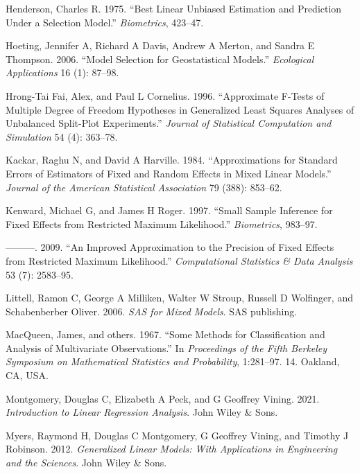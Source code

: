 \documentclass{article}
\begin{document}
\leavevmode\hypertarget{ref-henderson1975best}{}%
Henderson, Charles R. 1975. ``Best Linear Unbiased Estimation and
Prediction Under a Selection Model.'' \emph{Biometrics}, 423--47.

\leavevmode\hypertarget{ref-hoeting2006model}{}%
Hoeting, Jennifer A, Richard A Davis, Andrew A Merton, and Sandra E
Thompson. 2006. ``Model Selection for Geostatistical Models.''
\emph{Ecological Applications} 16 (1): 87--98.

\leavevmode\hypertarget{ref-hrong1996approximate}{}%
Hrong-Tai Fai, Alex, and Paul L Cornelius. 1996. ``Approximate F-Tests
of Multiple Degree of Freedom Hypotheses in Generalized Least Squares
Analyses of Unbalanced Split-Plot Experiments.'' \emph{Journal of
Statistical Computation and Simulation} 54 (4): 363--78.

\leavevmode\hypertarget{ref-kackar1984approximations}{}%
Kackar, Raghu N, and David A Harville. 1984. ``Approximations for
Standard Errors of Estimators of Fixed and Random Effects in Mixed
Linear Models.'' \emph{Journal of the American Statistical Association}
79 (388): 853--62.

\leavevmode\hypertarget{ref-kenward1997small}{}%
Kenward, Michael G, and James H Roger. 1997. ``Small Sample Inference
for Fixed Effects from Restricted Maximum Likelihood.''
\emph{Biometrics}, 983--97.

\leavevmode\hypertarget{ref-kenward2009improved}{}%
---------. 2009. ``An Improved Approximation to the Precision of Fixed
Effects from Restricted Maximum Likelihood.'' \emph{Computational
Statistics \& Data Analysis} 53 (7): 2583--95.

\leavevmode\hypertarget{ref-littell2006sas}{}%
Littell, Ramon C, George A Milliken, Walter W Stroup, Russell D
Wolfinger, and Schabenberber Oliver. 2006. \emph{SAS for Mixed Models}.
SAS publishing.

\leavevmode\hypertarget{ref-macqueen1967some}{}%
MacQueen, James, and others. 1967. ``Some Methods for Classification and
Analysis of Multivariate Observations.'' In \emph{Proceedings of the
Fifth Berkeley Symposium on Mathematical Statistics and Probability},
1:281--97. 14. Oakland, CA, USA.

\leavevmode\hypertarget{ref-montgomery2021introduction}{}%
Montgomery, Douglas C, Elizabeth A Peck, and G Geoffrey Vining. 2021.
\emph{Introduction to Linear Regression Analysis}. John Wiley \& Sons.

\leavevmode\hypertarget{ref-myers2012generalized}{}%
Myers, Raymond H, Douglas C Montgomery, G Geoffrey Vining, and Timothy J
Robinson. 2012. \emph{Generalized Linear Models: With Applications in
Engineering and the Sciences}. John Wiley \& Sons.
\end{document}
